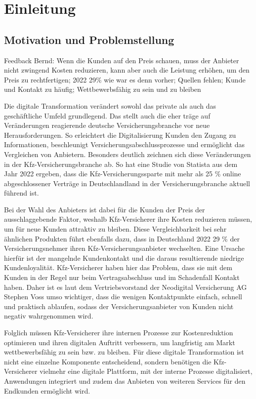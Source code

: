 \chapter{Einleitung}

\section{Motivation und Problemstellung}

Feedback Bernd: Wenn die Kunden auf den Preis schauen, muss der Anbieter nicht zwingend Kosten reduzieren, kann aber auch die Leistung erhöhen, um den Preis zu rechtfertigen; 2022 29\% wie war es denn vorher; Quellen fehlen; Kunde und Kontakt zu häufig; Wettbewerbsfähig zu sein und zu bleiben 

Die digitale Transformation verändert sowohl das private als auch das geschäftliche Umfeld grundlegend. Das stellt auch die eher träge auf Veränderungen reagierende deutsche Versicherungsbranche vor neue Herausforderungen. So erleichtert die Digitalisierung Kunden den Zugang zu Informationen, beschleunigt Versicherungsabschlussprozesse und ermöglicht das Vergleichen von Anbietern. Besonders deutlich zeichnen sich diese Veränderungen in der Kfz-Versicherungsbranche ab. So hat eine Studie von Statista aus dem Jahr 2022 ergeben, dass die Kfz-Versicherungssparte mit mehr als 25 \% online abgeschlossener Verträge in Deutschlandland in der Versicherungsbranche aktuell führend ist.

Bei der Wahl des Anbieters ist dabei für die Kunden der Preis der ausschlaggebende Faktor, weshalb Kfz-Versicherer ihre Kosten reduzieren müssen, um für neue Kunden attraktiv zu bleiben. Diese Vergleichbarkeit bei sehr ähnlichen Produkten führt ebenfalls dazu, dass in Deutschland 2022 29 \% der Versicherungsnehmer ihren Kfz-Versicherungsanbieter wechselten. Eine Ursache hierfür ist der mangelnde Kundenkontakt und die daraus resultierende niedrige Kundenloyalität. Kfz-Versicherer haben hier das Problem, dass sie mit dem Kunden in der Regel nur beim Vertragsabschluss und im Schadenfall Kontakt haben. Daher ist es laut dem Vertriebsvorstand der Neodigital Versicherung AG Stephen Voss umso wichtiger, dass die wenigen Kontaktpunkte einfach, schnell und praktisch ablaufen, sodass der Versicherungsanbieter von Kunden nicht negativ wahrgenommen wird. 

Folglich müssen Kfz-Versicherer ihre internen Prozesse zur Kostenreduktion optimieren und ihren digitalen Auftritt verbessern, um  langfristig am Markt wettbewerbsfähig zu sein bzw. zu bleiben. Für diese digitale Transformation ist nicht eine einzelne Komponente entscheidend, sondern benötigen die Kfz-Versicherer vielmehr eine digitale Plattform, mit der interne Prozesse digitalisiert, Anwendungen integriert und zudem das Anbieten von weiteren Services für den Endkunden ermöglicht wird.

